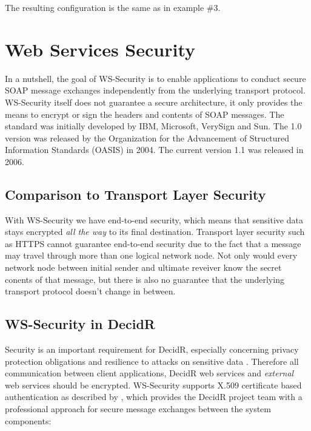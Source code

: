 The resulting configuration is the same as in example \#3.

\newpage
\section{Web Services Security}
\label{chap:web-services-security}

In a nutshell, the goal of WS-Security is to enable applications to conduct
secure SOAP message exchanges\supercite{ws-sec} independently from the underlying transport
protocol. WS-Security itself does not guarantee a secure architecture, it only
provides the means to encrypt or sign the headers and contents of SOAP
messages. The standard was initially developed by IBM, Microsoft, VerySign and
Sun. The 1.0 version was released by the Organization for the Advancement
of Structured Information Standards (OASIS) in 2004. The current version 1.1
was released in 2006.

\subsection{Comparison to Transport Layer Security}
\label{sec:comparison-to-transport-layer-securtiy}

With WS-Security we have end-to-end security, which means that sensitive data
stays encrypted \emph{all the way} to its final destination. Transport layer
security such as HTTPS cannot guarantee end-to-end security due to
the fact that a message may travel through more than one logical network node.
Not only would every network node between initial sender and ultimate reveiver
know the secret conents of that message, but there is also no guarantee that the 
underlying transport protocol doesn't change in between.


\subsection{WS-Security in DecidR}
\label{subsec:ws-security-in-decidr}

Security is an important requirement for DecidR, especially concerning privacy
protection obligations and resilience to attacks on
sensitive data \supercite{decidr-spec}. Therefore all communication between
client applications, DecidR web services and \emph{external} web services should
be encrypted. WS-Security supports X.509 certificate based authentication as 
described by \supercite{x509}, which provides the DecidR project team with a 
professional approach for secure message exchanges between the system
components:

